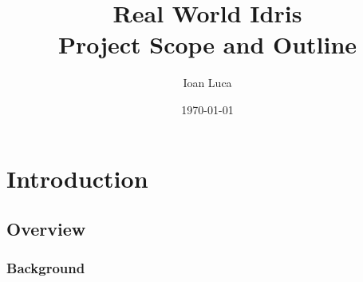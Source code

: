 \documentclass[a4paper]{report}
\begin{document}
\title{Real World Idris \\ Project Scope and Outline}
\author{Ioan Luca}
\date{\today}
\maketitle


\tableofcontents




\chapter{Introduction}
\section{Overview}
\subsection{Background}
\end{document}
